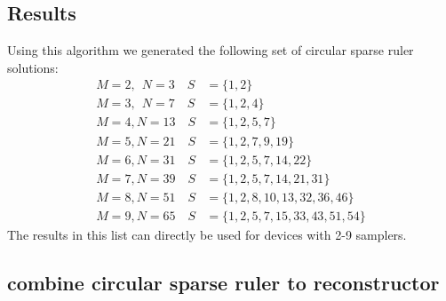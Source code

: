 \documentclass[a4paper, openany, oneside]{memoir}
\begin{document}
\subsection{Results}
Using this algorithm we generated the following set of circular sparse ruler solutions:
\begin{align}
M=2,\;\,N=3  \quad S&=\{1,2\}\\
M=3,\;\,N=7  \quad S&=\{1,2,4\}\\
M=4,N=13 \quad S&=\{1,2,5,7\}\\
M=5,N=21 \quad S&=\{1,2,7,9, 19\}\\
M=6,N=31 \quad S&=\{1,2,5,7,14,22\}\\
M=7,N=39 \quad S&=\{1,2,5,7,14,21,31\}\\
M=8,N=51 \quad S&=\{1,2,8,10,13,32,36, 46\}\\
M=9,N=65 \quad S&=\{1,2,5,7,15, 33, 43, 51, 54\}
\end{align}
The results in this list can directly be used for devices with 2-9 samplers. 


\subsection{combine circular sparse ruler to reconstructor}\label{sub:ci-circ}

\end{document}
